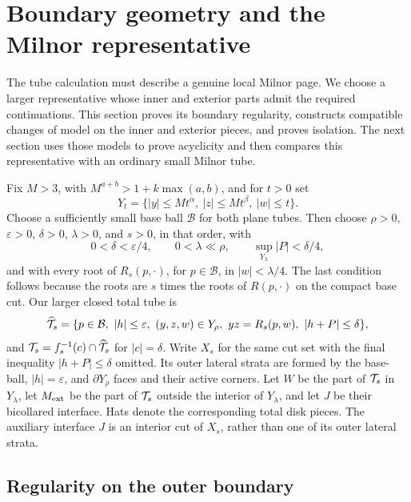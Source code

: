 \section{Boundary geometry and the Milnor representative}\label{sec:boundary-geometry}

The tube calculation must describe a genuine local Milnor page.
We choose a larger representative whose inner and exterior
parts admit the required continuations. This section proves its
boundary regularity, constructs compatible changes of model on the
inner and exterior pieces, and proves isolation. The next section
uses those models to prove acyclicity and then compares this
representative with an ordinary small Milnor tube.

Fix \(M>3\), with \(M^{a+b}>1+k\max(a,b)\), and for
\(t>0\) set
\[
Y_t=\{|y|\le Mt^\alpha,\ |z|\le Mt^\beta,\ |w|\le t\}.
\]
Choose a sufficiently small base ball \(\mathcal B\) for both
plane tubes. Then choose \(\rho>0\), \(\varepsilon>0\),
\(\delta>0\), \(\lambda>0\), and \(s>0\), in that order, with
\begin{equation}
0<\delta<\varepsilon/4,\qquad 0<\lambda\ll\rho,\qquad
\sup_{Y_\lambda}|P|<\delta/4,
\label{eq:tube-3}
\end{equation}
and with every root of \(R_s(p,\cdot)\), for \(p\in\mathcal B\),
in \(|w|<\lambda/4\). The last condition follows because the roots
are \(s\) times the roots of \(R(p,\cdot)\) on the compact base cut.
Our larger closed total tube is
\begin{equation}
\widehat{\mathcal T}_s=
\{p\in\mathcal B,\ |h|\le\varepsilon,\ (y,z,w)\in Y_\rho,\
yz=R_s(p,w),\ |h+P|\le\delta\},
\label{eq:tube-4}
\end{equation}
and \(\mathcal T_s=f_s^{-1}(c)\cap\widehat{\mathcal T}_s\) for \(|c|=\delta\).
Write \(X_s\) for the same cut set with the final inequality
\(|h+P|\le\delta\) omitted. Its outer lateral strata are formed by
the base-ball, \(|h|=\varepsilon\), and \(\partial Y_\rho\) faces
and their active corners.
Let \(W\) be the part of \(\mathcal T_s\) in \(Y_\lambda\), let
\(M_{\rm ext}\) be the part of \(\mathcal T_s\) outside the interior of
\(Y_\lambda\), and let \(J\) be their
bicollared interface. Hats denote the corresponding total disk pieces.
The auxiliary interface \(J\) is an interior cut of \(X_s\), rather
than one of its outer lateral strata.

\subsection{Regularity on the outer boundary}

